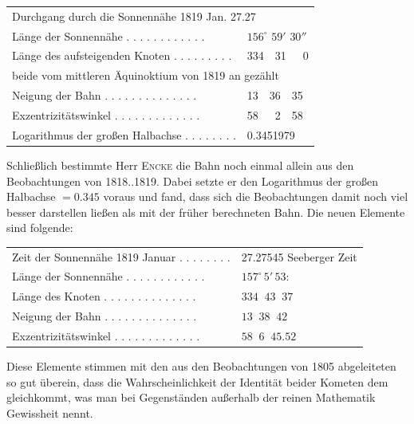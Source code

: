 \begin{center}
\begin{tabular}{l l}
\multicolumn{2}{l}{Durchgang durch die Sonnennähe 1819 Jan. 27.27} \\
Länge der Sonnennähe . . . . . . . . . . . . & $156^\circ$ $59'$ $30''$ \\
Länge des aufsteigenden Knoten . . . . . . . . . & 334\ \ 31\ \ \ 0 \\
\multicolumn{2}{l}{\quad beide vom mittleren Äquinoktium von 1819 an gezählt} \\
Neigung der Bahn . . . . . . . . . . . . . . & 13\ \ 36\ \ 35 \\
Exzentrizitätswinkel . . . . . . . . . . . . . & 58\ \ \ 2\ \ 58 \\
Logarithmus der großen Halbachse . . . . . . . . & 0.3451979 \\
\end{tabular}
\end{center}

\par\indent Schließlich bestimmte Herr \textsc{Encke} die Bahn noch einmal allein aus den Beobachtungen von 1818..1819. Dabei setzte er den Logarithmus der großen Halbachse $= 0.345$ voraus und fand, dass sich die Beobachtungen damit noch viel besser darstellen ließen als mit der früher berechneten Bahn. Die neuen Elemente sind folgende:

\begin{center}
\begin{tabular}{l l}
Zeit der Sonnennähe 1819 Januar . . . . . . . . & 27.27545 Seeberger Zeit \\
Länge der Sonnennähe . . . . . . . . . . . . & $157^\circ\,5'\,53$: \\ 
Länge des Knoten . . . . . . . . . . . . . . & $334\;\;43\;\;37$ \\
Neigung der Bahn . . . . . . . . . . . . . . & $13\;\;38\;\;42$ \\
Exzentrizitätswinkel . . . . . . . . . . . . . & $58\;\;6\;\;45.52$ \\
\end{tabular}
\end{center}

\par\indent Diese Elemente stimmen mit den aus den Beobachtungen von 1805 abgeleiteten so gut überein, dass die Wahrscheinlichkeit der Identität beider Kometen dem gleichkommt, was man bei Gegenständen außerhalb der reinen Mathematik Gewissheit nennt.

